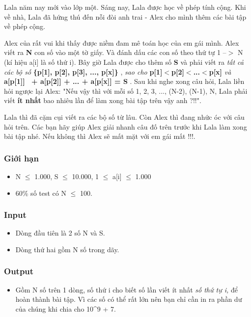 



   Lala năm nay mới vào lớp một. Sáng nay, Lala được học về phép tính cộng. Khi về nhà, Lala đã hứng thú đến nỗi đòi anh trai - Alex cho mình thêm các bài tập về phép cộng.  

   Alex của rất vui khi thấy được niềm đam mê toán học của em gái mình. Alex viết ra   \textbf{    N   }   con số vào một tờ giấy. Và đánh dấu các con số theo thứ tự 1 --$>$ N (kí hiệu a[i] là số thứ i). Bây giờ Lala được cho thêm số   \textbf{    S   }   và phải viết ra   \emph{    tất cả các bộ số   }\textbf{    \{p[1], p[2], p[3], ..., p[x]\}   }   ,   \emph{    sao cho   }\textbf{\emph{}    p[1]$<$p[2]$<$...$<$p[x]   }\emph{    và   }\textbf{    a[p[1]]  + a[p[2]] + ... + a[p[x]] = S   }   . Sau khi nghe xong câu hỏi, Lala liền hỏi ngược lại Alex: "Nếu vậy thì với mỗi số 1, 2, 3, ..., (N-2), (N-1), N, Lala phải viết   \textbf{    ít nhất   }   bao nhiêu lần để làm xong bài tập trên vậy anh ?!!".  

   Lala thì đã cặm cụi viết ra các bộ số từ lâu. Còn Alex thì đang nhức óc với câu hỏi trên. Các bạn hãy giúp Alex giải nhanh câu đố trên trước khi Lala làm xong bài tập nhé. Nếu không thì Alex sẽ mất mặt với em gái mất !!!.  

\subsubsection{   Giới hạn  }
\begin{itemize}
	\item     N  $\le$  1.000, S  $\le$  10.000, 1 $\le$  a[i]  $\le$  1.000   
	\item     60\% số test có N  $\le$  100.   
\end{itemize}

\subsubsection{   Input  }
\begin{itemize}
	\item     Dòng đầu tiên là 2 số N và S.   
	\item     Dòng thứ hai gồm N số trong dãy.   
\end{itemize}

\subsubsection{   Output  }
\begin{itemize}
	\item     Gồm N số trên 1 dòng, số thứ i cho biết số lần viết    \emph{}    ít nhất    \emph{     số thứ tự i,    }    để hoàn thành bài tập. Vì các số có thể rất lớn nên bạn chỉ cần in ra phần dư của chúng khi chia cho 10\textasciicircum9 + 7.   
\end{itemize}

